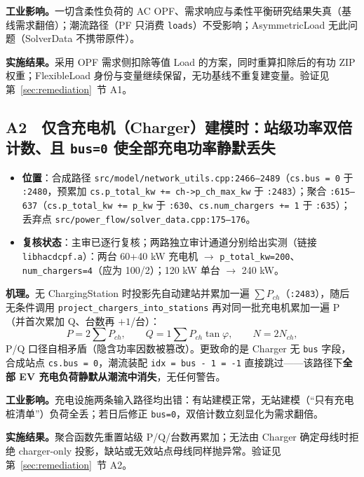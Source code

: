 \documentclass[11pt,a4paper,fontset=fandol]{ctexart}
\newcommand{\file}[1]{\texttt{#1}}
\begin{document}
\textbf{工业影响。}一切含柔性负荷的 AC OPF、需求响应与柔性平衡研究结果失真（基线需求翻倍）；潮流路径（PF 只消费 \texttt{loads}）不受影响；AsymmetricLoad 无此问题（SolverData 不携带原件）。

\textbf{实施结果。}采用 OPF 需求侧扣除等值 Load 的方案，同时重算扣除后的有功 ZIP 权重；FlexibleLoad 身份与变量继续保留，无功基线不重复建变量。验证见第~\ref{sec:remediation}~节 A1。

\subsection{A2　仅含充电机（Charger）建模时：站级功率双倍计数、且 \texttt{bus=0} 使全部充电功率静默丢失}
\label{sec:a2}

\begin{itemize}
  \item \textbf{位置}：合成路径 \file{src/model/network\_utils.cpp:2466--2489}（\texttt{cs.bus = 0} 于 \file{:2480}，预累加 \texttt{cs.p\_total\_kw += ch->p\_ch\_max\_kw} 于 \file{:2483}）；聚合 \file{:615--637}（\texttt{cs.p\_total\_kw += p\_kw} 于 \file{:630}、\texttt{cs.num\_chargers += 1} 于 \file{:635}）；丢弃点 \file{src/power\_flow/solver\_data.cpp:175--176}。
  \item \textbf{复核状态}：主审已逐行复核；两路独立审计通道分别给出实测（链接 \file{libhacdcpf.a}）：两台 60+40 kW 充电机 $\to$ \texttt{p\_total\_kw=200}、\texttt{num\_chargers=4}（应为 100/2）；120 kW 单台 $\to$ 240 kW。
\end{itemize}

\textbf{机理。}无 ChargingStation 时投影先自动建站并累加一遍 $\sum P_{ch}$（\file{:2483}），随后无条件调用 \file{project\_chargers\_into\_stations} 再对同一批充电机累加一遍 P（并首次累加 Q、台数再 $+1$/台）：
\begin{equation}
P = 2\sum P_{ch},\qquad Q = 1\sum P_{ch}\tan\varphi,\qquad N = 2N_{ch},
\end{equation}
P/Q 口径自相矛盾（隐含功率因数被篡改）。更致命的是 Charger 无 \texttt{bus} 字段，合成站点 \texttt{cs.bus = 0}，潮流装配 \texttt{idx = bus - 1 = -1} 直接跳过——该路径下\textbf{全部 EV 充电负荷静默从潮流中消失}，无任何警告。

\textbf{工业影响。}充电设施两条输入路径均出错：有站建模正常，无站建模（``只有充电桩清单''）负荷全丢；若日后修正 \texttt{bus=0}，双倍计数立刻显化为需求翻倍。

\textbf{实施结果。}聚合函数先重置站级 P/Q/台数再累加；无法由 Charger 确定母线时拒绝 charger-only 投影，缺站或无效站点母线同样抛异常。验证见第~\ref{sec:remediation}~节 A2。
\end{document}
